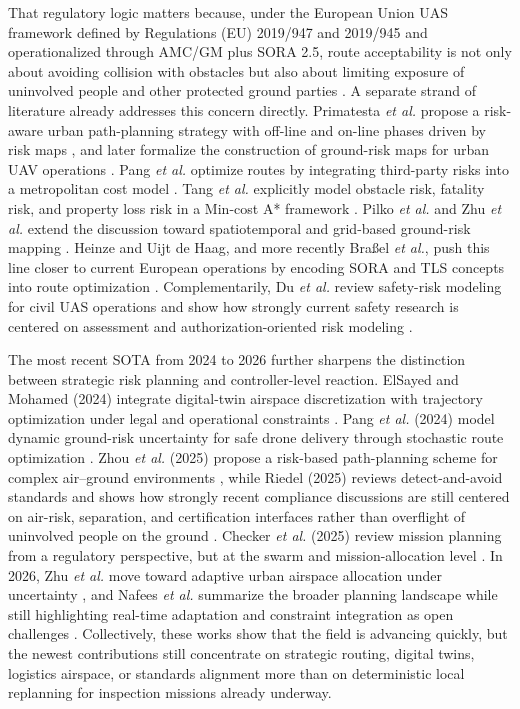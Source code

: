\documentclass[a4paper,11pt]{article}
\begin{document}
That regulatory logic matters because, under the European Union UAS framework defined by Regulations (EU) 2019/947 and 2019/945 and operationalized through AMC/GM plus SORA 2.5, route acceptability is not only about avoiding collision with obstacles but also about limiting exposure of uninvolved people and other protected ground parties \cite{EU2019_947,EU2019_945,JARUS_SORA_2_5_2024,EASA_AMC_GM_SORA25_2025}. A separate strand of literature already addresses this concern directly. Primatesta \emph{et al.} propose a risk-aware urban path-planning strategy with off-line and on-line phases driven by risk maps \cite{primatesta2019riskaware}, and later formalize the construction of ground-risk maps for urban UAV operations \cite{primatesta2020groundrisk}. Pang \emph{et al.} optimize routes by integrating third-party risks into a metropolitan cost model \cite{pang2022integrated}. Tang \emph{et al.} explicitly model obstacle risk, fatality risk, and property loss risk in a Min-cost A* framework \cite{tang2023thirdparty}. Pilko \emph{et al.} and Zhu \emph{et al.} extend the discussion toward spatiotemporal and grid-based ground-risk mapping \cite{pilko2023spatiotemporal,zhang2023groundrisk}. Heinze and Uijt de Haag, and more recently Bra{\ss}el \emph{et al.}, push this line closer to current European operations by encoding SORA and TLS concepts into route optimization \cite{heinze2023sora,brassel2025riskaware}. Complementarily, Du \emph{et al.} review safety-risk modeling for civil UAS operations and show how strongly current safety research is centered on assessment and authorization-oriented risk modeling \cite{du2024safetyrisk}.

The most recent SOTA from 2024 to 2026 further sharpens the distinction between strategic risk planning and controller-level reaction. ElSayed and Mohamed (2024) integrate digital-twin airspace discretization with trajectory optimization under legal and operational constraints \cite{elsayed2024digitaltwin}. Pang \emph{et al.} (2024) model dynamic ground-risk uncertainty for safe drone delivery through stochastic route optimization \cite{pang2024stochastic}. Zhou \emph{et al.} (2025) propose a risk-based path-planning scheme for complex air--ground environments \cite{zhou2025riskbased}, while Riedel (2025) reviews detect-and-avoid standards and shows how strongly recent compliance discussions are still centered on air-risk, separation, and certification interfaces rather than overflight of uninvolved people on the ground \cite{riedel2025daa}. Checker \emph{et al.} (2025) review mission planning from a regulatory perspective, but at the swarm and mission-allocation level \cite{checker2025regulatory}. In 2026, Zhu \emph{et al.} move toward adaptive urban airspace allocation under uncertainty \cite{zhu2026adaptive}, and Nafees \emph{et al.} summarize the broader planning landscape while still highlighting real-time adaptation and constraint integration as open challenges \cite{nafees2026review}. Collectively, these works show that the field is advancing quickly, but the newest contributions still concentrate on strategic routing, digital twins, logistics airspace, or standards alignment more than on deterministic local replanning for inspection missions already underway.
\end{document}
